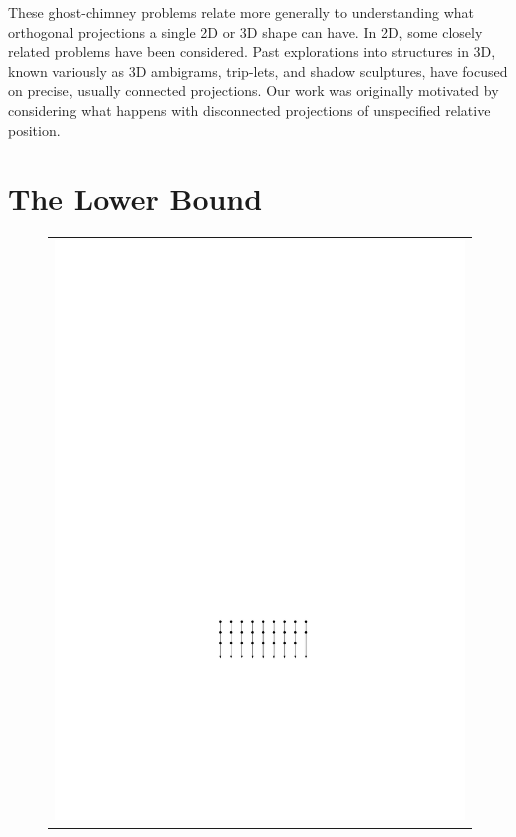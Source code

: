 \documentclass{ws-ijcga}
\begin{document}
These ghost-chimney problems relate more generally to understanding
what orthogonal projections a single 2D or 3D shape can have. In 2D,
some closely related problems have been considered\cite{Ski,mat}. 
Past explorations into structures in 3D, known variously as 3D ambigrams,
trip-lets, and shadow sculptures, have focused on precise, usually
connected projections\cite{triplets,ShadowArt}. 
Our work was originally motivated by considering what happens with disconnected projections of unspecified relative position.

\section{The Lower Bound}
\begin{figure}
  \centering
  \begin{tabular}{cc}
\multicolumn{2}{c}{\includegraphics[scale=0.9]{j0}}\\

\end{tabular}
\end{figure}
\end{document}
